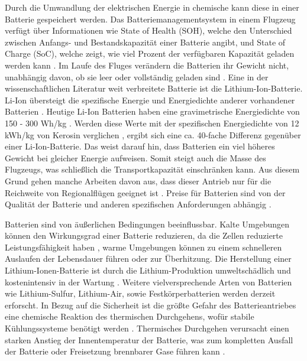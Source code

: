 Durch die Umwandlung der elektrischen Energie in chemische kann diese in einer Batterie gespeichert werden. 
Das Batteriemanagementsystem in einem Flugzeug verfügt über Informationen wie State of Health (SOH), 
welche den Unterschied zwischen Anfangs- und Bestandskapazität einer Batterie angibt, 
und State of Charge (SoC), welche zeigt, wie viel Prozent der verfügbaren Kapazität geladen werden kann \cite{donckers2024electric}.
Im Laufe des Fluges verändern die Batterien ihr Gewicht nicht, unabhängig davon, ob sie leer oder vollständig geladen sind \cite{donckers2024electric}. 
Eine in der wissenschaftlichen Literatur weit verbreitete Batterie ist die Lithium-Ion-Batterie.  
Li-Ion übersteigt die spezifische Energie und Energiedichte anderer vorhandener Batterien \cite{budde2013review}.
%
Heutige Li-Ion Batterien haben eine gravimetrische Energiedichte von 150 - 300 Wh/kg \cite{colpan2022fuel}. 
Werden diese Werte mit der spezifischen Energiedichte von 12 kWh/kg von Kerosin verglichen \cite{dalmia2022powering},
ergibt sich eine ca. 40-fache Differenz gegenüber einer Li-Ion-Batterie. 
Das weist darauf hin, dass Batterien ein viel höheres Gewicht bei gleicher Energie aufweisen. 
Somit steigt auch die Masse des Flugzeugs, was schließlich die Transportkapazität einschränken kann. 
Aus diesem Grund gehen manche Arbeiten davon aus, dass dieser Antrieb 
nur für die Reichweite von Regionalflügen geeignet ist \cite{abrantes2024impact}.
Preise für Batterien sind von der Qualität der Batterie und anderen spezifischen Anforderungen abhängig \cite{budde2013review}.

%
Batterien sind von äußerlichen Bedingungen beeinflussbar. 
Kalte Umgebungen können den Wirkungsgrad einer Batterie reduzieren, da die Zellen reduzierte Leistungsfähigkeit haben \cite{budde2013review}, 
warme Umgebungen können zu einem schnelleren Auslaufen der Lebensdauer führen \cite{donckers2024electric} oder zur Überhitzung. 
Die Herstellung einer Lithium-Ionen-Batterie ist durch die Lithium-Produktion umweltschädlich 
und kostenintensiv in der Wartung \cite{dalmia2022powering}. 
Weitere vielversprechende Arten von Batterien wie 
Lithium-Sulfur, Lithium-Air, sowie Festkörperbatterien werden derzeit erforscht.
%
%
%
In Bezug auf die Sicherheit ist die größte Gefahr des Batterieantriebes eine chemische Reaktion des thermischen Durchgehens, 
wofür stabile Kühlungssysteme benötigt werden \cite{donckers2024electric}. 
Thermisches Durchgehen verursacht einen starken Anstieg der Innentemperatur der Batterie, 
was zum kompletten Ausfall der Batterie oder Freisetzung brennbarer Gase führen kann \cite{shahid2022review}.


